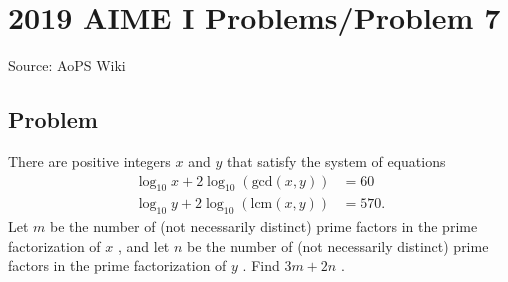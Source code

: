 \documentclass[12pt]{article}
\begin{document}
\section*{{2019 AIME I Problems/Problem 7}}
Source: AoPS Wiki

\subsection*{Problem}
There are positive integers $x$ and $y$ that satisfy the system of equations
\begin{align*}
\log_{10} x + 2 \log_{10} (\text{gcd}(x,y)) &= 60\\
\log_{10} y + 2 \log_{10} (\text{lcm}(x,y)) &= 570.
\end{align*}
Let $m$ be the number of (not necessarily distinct) prime factors in the prime factorization of $x$ , and let $n$ be the number of (not necessarily distinct) prime factors in the prime factorization of $y$ . Find $3m+2n$ .
\end{document}
